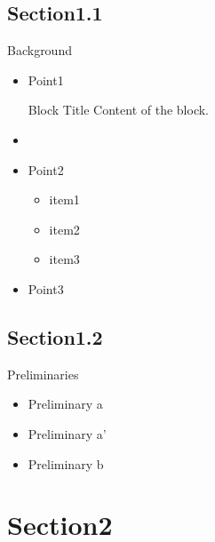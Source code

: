 \documentclass[compress]{beamer}
\begin{document}
\subsection{Section1.1}
\begin{frame}{Background} 
    \begin{itemize} %
        \item Point1
            \begin{center}
                \begin{minipage}{10.3cm}
                \begin{block}{Block Title}
                    Content of the block.
                \end{block}
                \end{minipage}
            \end{center}
        \item[] %
        \item Point2
            \begin{itemize}
                \item item1
                \item item2
                \item item3
            \end{itemize}
        \item Point3
    \end{itemize}
\end{frame}

\subsection{Section1.2}
\begin{frame}{Preliminaries}
    \begin{itemize}
        \item<1-> Preliminary a
        \item<1-> Preliminary a'
        \item<2-> Preliminary b
    \end{itemize}
\end{frame}

\section{Section2}
\end{document}
